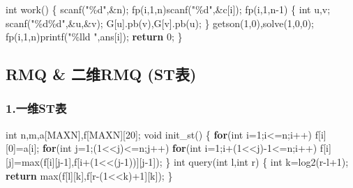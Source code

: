 \documentclass[
]{article}
\newenvironment{Shaded}{}{}
\newcommand{\ControlFlowTok}[1]{\textcolor[rgb]{0.00,0.44,0.13}{\textbf{#1}}}
\newcommand{\DataTypeTok}[1]{\textcolor[rgb]{0.56,0.13,0.00}{#1}}
\newcommand{\DecValTok}[1]{\textcolor[rgb]{0.25,0.63,0.44}{#1}}
\newcommand{\NormalTok}[1]{#1}
\newcommand{\SpecialCharTok}[1]{\textcolor[rgb]{0.25,0.44,0.63}{#1}}
\newcommand{\StringTok}[1]{\textcolor[rgb]{0.25,0.44,0.63}{#1}}
\begin{document}
\begin{Shaded}
\begin{Highlighting}[]
\DataTypeTok{int}\NormalTok{ work()}
\NormalTok{\{}
\NormalTok{    scanf(}\StringTok{"}\SpecialCharTok{\%d}\StringTok{"}\NormalTok{,\&n);}
\NormalTok{    fp(i,}\DecValTok{1}\NormalTok{,n)scanf(}\StringTok{"}\SpecialCharTok{\%d}\StringTok{"}\NormalTok{,\&c[i]);}
\NormalTok{    fp(i,}\DecValTok{1}\NormalTok{,n{-}}\DecValTok{1}\NormalTok{)}
\NormalTok{    \{}
        \DataTypeTok{int}\NormalTok{ u,v;}
\NormalTok{        scanf(}\StringTok{"}\SpecialCharTok{\%d\%d}\StringTok{"}\NormalTok{,\&u,\&v);}
\NormalTok{        G[u].pb(v),G[v].pb(u);}
\NormalTok{    \}}
\NormalTok{    getson(}\DecValTok{1}\NormalTok{,}\DecValTok{0}\NormalTok{),solve(}\DecValTok{1}\NormalTok{,}\DecValTok{0}\NormalTok{,}\DecValTok{0}\NormalTok{);}
\NormalTok{    fp(i,}\DecValTok{1}\NormalTok{,n)printf(}\StringTok{"}\SpecialCharTok{\%lld}\StringTok{ "}\NormalTok{,ans[i]);}
    \ControlFlowTok{return} \DecValTok{0}\NormalTok{;}
\NormalTok{\}}
\end{Highlighting}
\end{Shaded}

\hypertarget{rmq-ux4e8cux7ef4rmq-stux8868}{%
\subsection{RMQ \& 二维RMQ (ST表)}\label{rmq-ux4e8cux7ef4rmq-stux8868}}

\hypertarget{ux4e00ux7ef4stux8868}{%
\subsubsection{1.一维ST表}\label{ux4e00ux7ef4stux8868}}

\begin{Shaded}
\begin{Highlighting}[]
\DataTypeTok{int}\NormalTok{ n,m,a[MAXN],f[MAXN][}\DecValTok{20}\NormalTok{];}
\DataTypeTok{void}\NormalTok{ init\_st()}
\NormalTok{\{}
    \ControlFlowTok{for}\NormalTok{(}\DataTypeTok{int}\NormalTok{ i=}\DecValTok{1}\NormalTok{;i\textless{}=n;i++) f[i][}\DecValTok{0}\NormalTok{]=a[i];}
    \ControlFlowTok{for}\NormalTok{(}\DataTypeTok{int}\NormalTok{ j=}\DecValTok{1}\NormalTok{;(}\DecValTok{1}\NormalTok{\textless{}\textless{}j)\textless{}=n;j++)}
        \ControlFlowTok{for}\NormalTok{(}\DataTypeTok{int}\NormalTok{ i=}\DecValTok{1}\NormalTok{;i+(}\DecValTok{1}\NormalTok{\textless{}\textless{}j){-}}\DecValTok{1}\NormalTok{\textless{}=n;i++)}
\NormalTok{            f[i][j]=max(f[i][j{-}}\DecValTok{1}\NormalTok{],f[i+(}\DecValTok{1}\NormalTok{\textless{}\textless{}(j{-}}\DecValTok{1}\NormalTok{))][j{-}}\DecValTok{1}\NormalTok{]);}
\NormalTok{\}}
\DataTypeTok{int}\NormalTok{ query(}\DataTypeTok{int}\NormalTok{ l,}\DataTypeTok{int}\NormalTok{ r)}
\NormalTok{\{}
    \DataTypeTok{int}\NormalTok{ k=log2(r{-}l+}\DecValTok{1}\NormalTok{);}
    \ControlFlowTok{return}\NormalTok{ max(f[l][k],f[r{-}(}\DecValTok{1}\NormalTok{\textless{}\textless{}k)+}\DecValTok{1}\NormalTok{][k]);}
\NormalTok{\}}
\end{Highlighting}
\end{Shaded}
\end{document}
